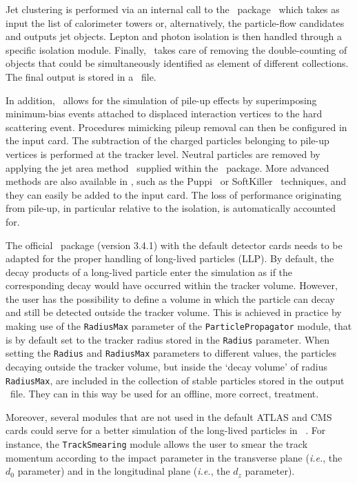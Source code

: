 Jet clustering is performed via an internal call to the \FJ\
package~\cite{Cacciari:2011ma} which takes as input the
list of calorimeter towers or, alternatively, the particle-flow candidates and
outputs jet objects. Lepton and photon isolation is then handled through a
specific isolation module. Finally, \DEL\ takes care of removing the
double-counting of objects that could be simultaneously identified as element of
different collections. The final output is stored in a \ROOT\ file.

In addition, \DEL\ allows for the simulation of pile-up effects by
superimposing minimum-bias events attached to displaced interaction vertices
to the hard scattering event. Procedures mimicking pileup
removal can then be configured in the input card. The subtraction of the charged
particles belonging to pile-up vertices is performed at the tracker level.
Neutral particles are removed by applying the jet area
method~\cite{Cacciari:2007fd} supplied within the \FJ\ package. More advanced methods are also available in \DEL, such as the
{\sc Puppi}~\cite{Bertolini:2014bba} or {\sc SoftKiller}~\cite{Cacciari:2014gra}
techniques, and they can easily be added to the input card. The loss of
performance originating from pile-up, in particular relative to the isolation, is
automatically accounted for.

The official \DEL\ package (version 3.4.1) with the default detector cards needs
to be adapted for the proper handling of long-lived particles (LLP).
By default, the decay products of a long-lived particle enter the
simulation as if the corresponding decay would have occurred within the
tracker volume. However, the user has the possibility to define a volume in
which the particle can decay and still be detected outside the tracker volume. This is achieved in
practice by making use of the \verb+RadiusMax+ parameter of the
\verb+ParticlePropagator+ module, that is by default set to the tracker radius
stored in the \verb+Radius+ parameter. When setting the \verb+Radius+ and
\verb+RadiusMax+ parameters to different values, the particles decaying outside
the tracker volume, but inside the `decay volume' of radius \verb+RadiusMax+, are
included in the collection of stable particles stored in the output \ROOT\ file.
They can in this way be used for an offline, more correct, treatment.

Moreover, several modules that are not used in the default ATLAS and CMS cards
could serve for a better simulation of the long-lived particles in \DEL\ . For
instance,
the \verb+TrackSmearing+ module allows the user to smear the track momentum
according to the impact parameter in the transverse plane ({\it i.e.}, the $d_0$
parameter) and in the longitudinal plane ({\it i.e.}, the $d_z$ parameter).

